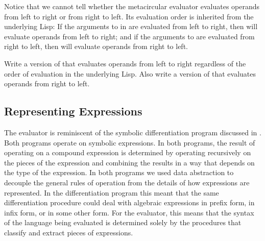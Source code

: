 \begin{exercise}
\label{Exercise 4.1}
	Notice that we cannot tell whether the metacircular evaluator evaluates operands from left to right or from right to left.
	Its evaluation order is inherited from the underlying Lisp:
	If the arguments to  in  are evaluated from left to right, then  will evaluate operands from left to right;
	and if the arguments to  are evaluated from right to left, then  will evaluate operands from right to left.

	Write a version of  that evaluates operands from left to right regardless of the order of evaluation in the underlying Lisp.
	Also write a version of  that evaluates operands from right to left.
\end{exercise}



\subsection{Representing Expressions}
\label{Section 4.1.2}

The evaluator is reminiscent of the symbolic differentiation program discussed in .
Both programs operate on symbolic expressions.
In both programs, the result of operating on a compound expression is determined by operating recursively on the pieces of the expression and combining the results in a way that depends on the type of the expression.
In both programs we used data abstraction to decouple the general rules of operation from the details of how expressions are represented.
In the differentiation program this meant that the same differentiation procedure could deal with algebraic expressions in prefix form, in infix form, or in some other form.
For the evaluator, this means that the syntax of the language being evaluated is determined solely by the procedures that classify and extract pieces of expressions.


